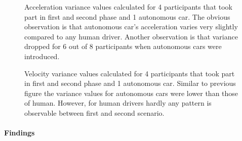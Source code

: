\documentclass[11pt,english]{article}
\begin{document}
\begin{figure}[!] %
\caption{Acceleration variance values calculated for 4 participants that took part in first and second phase and 1 autonomous car. The obvious observation is that autonomous car's acceleration varies very slightly compared to any human driver. Another observation is that variance dropped for 6 out of 8 participants when autonomous cars were introduced.}
\label{fig:acc_var}
\end{figure}


\begin{figure}[!] %
\caption{Velocity variance values calculated for 4 participants that took part in first and second phase and 1 autonomous car. Similar to previous figure the variance values for autonomous cars were lower than those of human. However, for human drivers hardly any pattern is observable between first and second scenario.}
\label{fig:vel_var}
\end{figure} 


\paragraph{Findings}
\end{document}
